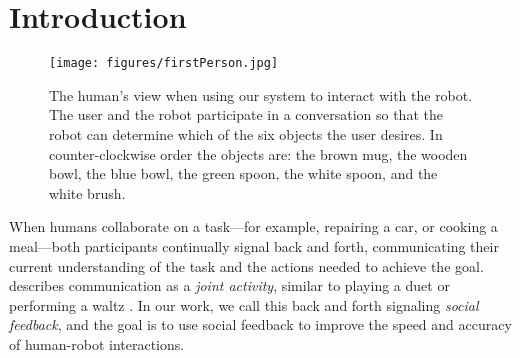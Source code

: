 \documentclass[letterpaper]{article}
\newcommand{\stnote}[1]{\textcolor{blue}{\textbf{ST: #1}}}
\begin{document}
\section{Introduction}
\begin{figure}[h]
\begin{center}
\texttt{[image: figures/firstPerson.jpg]}
\caption{\label{fig:firstPerson}The human's view when using our system to interact with the robot. The user and the robot participate in a conversation so that the robot can determine which of the
six objects the user desires. In counter-clockwise order the objects are: the brown mug, the wooden bowl, the blue bowl, the green spoon, the white spoon, and the white brush.}
\end{center}
\end{figure}




When humans collaborate on a task---for example, repairing a car, or cooking a meal---both participants continually signal back and forth, communicating their current understanding of the task and the actions needed to achieve the goal. \citeauthor{clark96} describes communication as a \textit{joint activity}, similar to playing a duet or performing a waltz \cite{clark96}. In our work, we call this back and forth signaling \textit{social feedback}, and the goal is to use social feedback to improve the speed and accuracy of human-robot interactions. 
\end{document}
